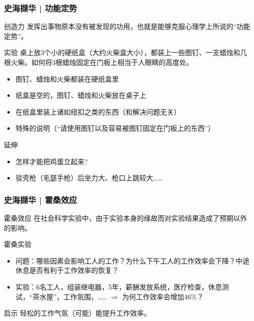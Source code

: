 \begin{frame}
  \frametitle{史海撷华 | 功能定势}
  \begin{block}{创造力}
    发挥出事物原本没有被发现的功用，也就是能够克服心理学上所说的“功能定势”。
  \end{block}
  \vspace{-0.5em}
  \pause
  \begin{block}{实验}
    桌上放3个小的硬纸盒（大约火柴盒大小），都装上一些图钉、一支蜡烛和几根火柴。如何将3根蜡烛固定在门板上相当于人眼睛的高度处。
    \begin{itemize}
      \item 图钉、蜡烛和火柴都装在硬纸盒里
      \item 纸盒是空的，图钉、蜡烛和火柴放在桌子上
      \item 在纸盒里装上诸如纽扣之类的东西（和解决问题无关）
      \item 特殊的说明（“请使用图钉以及容易被图钉固定在门板上的东西”）
    \end{itemize}
  \end{block}
  \vspace{-0.5em}
  \pause
  \begin{block}{延伸}
    \begin{itemize}
      \item 怎样才能把鸡蛋立起来?
      \item 驳壳枪（毛瑟手枪）后坐力大、枪口上跳较大……
    \end{itemize}
  \end{block}
\end{frame}

\begin{frame}
  \frametitle{史海撷华 | 霍桑效应}
  \begin{block}{霍桑效应}
    在社会科学实验中，由于实验本身的缘故而对实验结果造成了预期以外的影响。
  \end{block}
  \pause
  \begin{block}{霍桑实验}
    \begin{itemize}
      \item 问题：哪些因素会影响工人的工作？为什么下午工人的工作效率会下降？中途休息是否有利于工作效率的恢复？
      \item 实验：6名工人，组装继电器，5年，薪酬发放系统，医疗检查，休息测试，“茶水屋”，工作氛围，…… $\Longrightarrow$ 为何工作效率会增加46\%？
    \end{itemize}
  \end{block}
  \pause
  \begin{block}{启示}
    轻松的工作气氛（可能）能提升工作效率。
  \end{block}
\end{frame}

